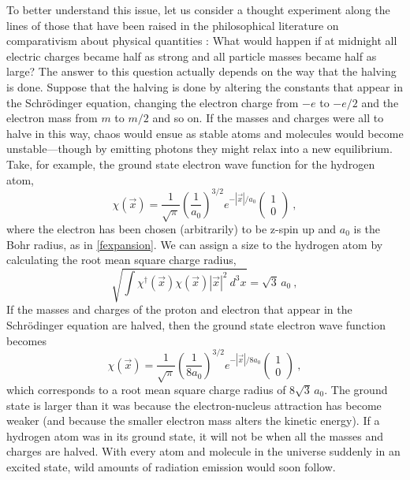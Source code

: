 \documentclass[12pt,onecolumn,secnumarabic,amsmath,amssymb,balancelastpage,nofootinbib]{article}
\begin{document}
To better understand this issue, let us consider a thought experiment along the lines of those that have been raised in the philosophical literature on comparativism about physical quantities \cite{dasgupta2013, dasguptaF, martens2017, martensF2, martensF, baker2021}:  What would happen if at midnight all electric charges became half as strong and all particle masses became half as large?  The answer to this question actually depends on the way that the halving is done.  Suppose that the halving is done by altering the constants that appear in the Schr\"{o}dinger equation, changing the electron charge from $-e$ to $-e/2$ and the electron mass from $m$ to $m/2$ and so on.  If the masses and charges were all to halve in this way, chaos would ensue as stable atoms and molecules would become unstable---though by emitting photons they might relax into a new equilibrium.  Take, for example, the ground state electron wave function for the hydrogen atom,
\begin{equation}
\chi(\vec{x})= \frac{1}{\sqrt{\pi}} \left(\frac{1}{a_0}\right)^{3/2}e^{- |\vec{x}| / a_0} \left(
\begin{matrix}
1 \\
0
\end{matrix}
\right)
\ ,
\label{hyrdogengroundstate}
\end{equation}
where the electron has been chosen (arbitrarily) to be z-spin up and $a_0$ is the Bohr radius, as in \eqref{fexpansion}.  We can assign a size to the hydrogen atom by calculating the root mean square charge radius,
\begin{equation}
\sqrt{\int{ \chi^{\dagger}(\vec{x}) \chi(\vec{x})|\vec{x}|^2 \  d^3 x }} = \sqrt{3} \, a_0
\ ,
\end{equation}
If the masses and charges of the proton and electron that appear in the Schr\"{o}dinger equation are halved, then the ground state electron wave function becomes
\begin{equation}
\chi(\vec{x})= \frac{1}{\sqrt{\pi}} \left(\frac{1}{8 a_0}\right)^{3/2}e^{- |\vec{x}| / 8 a_0} \left(
\begin{matrix}
1 \\
0
\end{matrix}
\right)
\ ,
\end{equation}
which corresponds to a root mean square charge radius of $8\sqrt{3} \, a_0$. The ground state is larger than it was because the electron-nucleus attraction has become weaker (and because the smaller electron mass alters the kinetic energy).  If a hydrogen atom was in its ground state, it will not be when all the masses and charges are halved.  With every atom and molecule in the universe suddenly in an excited state, wild amounts of radiation emission would soon follow.
\end{document}
